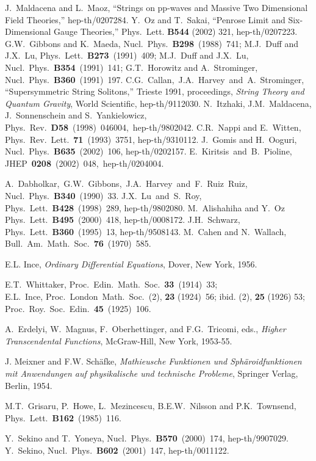 \documentclass[a4paper,12pt]{article}
\begin{document}
\begin{thebibliography}{99}
J.~Maldacena and L.~Maoz,
``Strings on pp-waves and Massive Two Dimensional Field Theories,''
hep-th/0207284.
Y.~Oz and T.~Sakai,
``Penrose Limit and Six-Dimensional Gauge Theories,''
Phys.~Lett. {\bf B544} (2002) 321, hep-th/0207223.
G.W.~Gibbons and K.~Maeda, 
Nucl.~Phys.~{\bf B298}~(1988)~741;
M.J.~Duff and J.X.~Lu,
Phys.~Lett.~{\bf B273}~(1991)~409;
M.J.~Duff and J.X.~Lu,
Nucl.~Phys.~{\bf B354}~(1991)~141;
G.T.~Horowitz and A.~Strominger, 
Nucl.~Phys.~{\bf B360}~(1991)~197.
C.G.~Callan,~J.A.~Harvey~and~A.~Strominger,~
``Supersymmetric String Solitons,''
Trieste 1991, proceedings, {\it String Theory
and Quantum Gravity}, World Scientific, 
hep-th/9112030.
N.~Itzhaki, J.M.~Maldacena, J.~Sonnenschein
and S.~Yankielowicz,\\
Phys.~Rev.~{\bf D58}~(1998)~046004,~hep-th/9802042.
C.R.~Nappi and E.~Witten, 
Phys.~Rev.~Lett.~{\bf 71}~(1993)~3751, hep-th/9310112.
J.~Gomis and H.~Ooguri,
Nucl.~Phys.~{\bf B635}~(2002)~106, hep-th/0202157.
E.~Kiritsis~and~B.~Pioline,
JHEP~{\bf 0208}~(2002)~048,~hep-th/0204004.

A.~Dabholkar,~G.W.~Gibbons,~J.A.~Harvey~and~F.~Ruiz~Ruiz,~
Nucl.~Phys.~{\bf B340}~(1990)~33.
J.X.~Lu~and~S.~Roy,
Phys.~Lett.~{\bf B428}~(1998)~289, hep-th/9802080.
M.~Alishahiha and Y.~Oz
Phys.~Lett.~{\bf  B495}~(2000)~418, hep-th/0008172.
J.H.~Schwarz, 
Phys.~Lett.~{\bf B360}~(1995)~13, hep-th/9508143.
M.~Cahen and N.~Wallach, 
Bull.~Am.~Math.~Soc.~{\bf 76}~(1970)~585.



 E.L. Ince, {\it Ordinary Differential Equations},
Dover, New York, 1956.

E.T.~Whittaker, Proc.~Edin.~Math.~Soc.~{\bf 33}~(1914)~33;\\
E.L.~Ince, Proc.~London~Math.~Soc.~(2), {\bf 23} (1924)~56;
ibid. (2), {\bf 25} (1926) 53;
Proc.~Roy.~Soc.~Edin.~{\bf 45}~(1925)~106.

A.~Erdelyi, W.~Magnus, F.~Oberhettinger, and 
F.G.~Tricomi, eds., {\it Higher
  Transcendental Functions}, 
McGraw-Hill, New York, 1953-55.


 J. Meixner and F.W. Sch\"afke,
{\it Mathieusche Funktionen und Sph\"aroidfunktionen mit 
Anwendungen auf physikalische und technische Probleme},
Springer Verlag, Berlin, 1954.


M.T.~Grisaru, P.~Howe, L.~Mezincescu,
B.E.W.~Nilsson and P.K.~Townsend,
Phys.~Lett.~{\bf B162}~(1985)~116.

Y.~Sekino and T.~Yoneya,
Nucl.~Phys.~{\bf B570}~(2000)~174, hep-th/9907029.
 Y.~Sekino,
Nucl.~Phys.~{\bf B602}~(2001)~147, hep-th/0011122.



\end{thebibliography}
\end{document}
